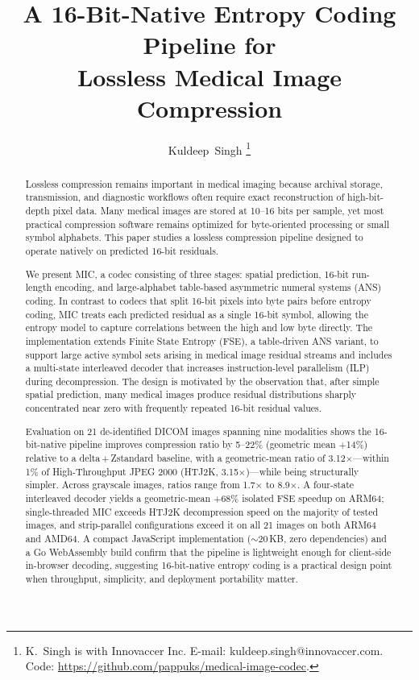 \documentclass[journal]{IEEEtran}
\title{A 16-Bit-Native Entropy Coding Pipeline for\\
       Lossless Medical Image Compression}
\author{Kuldeep~Singh%
\thanks{K.\ Singh is with Innovaccer Inc.
E-mail: kuldeep.singh@innovaccer.com.
Code: \url{https://github.com/pappuks/medical-image-codec}.}%
}
\begin{document}
\maketitle

\begin{abstract}
Lossless compression remains important in medical imaging because archival
storage, transmission, and diagnostic workflows often require exact
reconstruction of high-bit-depth pixel data. Many medical images are stored at
10--16 bits per sample, yet most practical compression software remains
optimized for byte-oriented processing or small symbol alphabets. This paper
studies a lossless compression pipeline designed to operate natively on
predicted 16-bit residuals.

We present MIC, a codec consisting of three stages: spatial prediction, 16-bit
run-length encoding, and large-alphabet table-based asymmetric numeral
systems (ANS) coding. In contrast to codecs that split 16-bit pixels into
byte pairs before entropy coding, MIC treats each predicted residual as a
single 16-bit symbol, allowing the entropy model to capture correlations
between the high and low byte directly. The implementation extends
Finite State Entropy (FSE), a table-driven ANS variant, to support large
active symbol sets arising in medical image residual streams and includes a
multi-state interleaved decoder that increases instruction-level parallelism
(ILP) during decompression. The design is motivated by the observation that,
after simple spatial prediction, many medical images produce residual
distributions sharply concentrated near zero with frequently repeated 16-bit
residual values.

Evaluation on 21 de-identified DICOM images spanning nine modalities shows the
16-bit-native pipeline improves compression ratio by 5--22\% (geometric mean
$+$14\%) relative to a delta\,+\,Zstandard baseline, with a geometric-mean
ratio of 3.12$\times$---within 1\% of High-Throughput JPEG 2000
(HTJ2K, 3.15$\times$)---while being structurally simpler. Across grayscale
images, ratios range from 1.7$\times$ to 8.9$\times$. A four-state interleaved
decoder yields a geometric-mean $+$68\% isolated FSE speedup on ARM64;
single-threaded MIC exceeds HTJ2K decompression speed on the majority of tested
images, and strip-parallel configurations exceed it on all 21 images on both
ARM64 and AMD64. A compact JavaScript implementation (${\sim}$20\,KB, zero
dependencies) and a Go WebAssembly build confirm that the pipeline is
lightweight enough for client-side in-browser decoding, suggesting 16-bit-native
entropy coding is a practical design point when throughput, simplicity, and
deployment portability matter.
\end{abstract}
\end{document}
